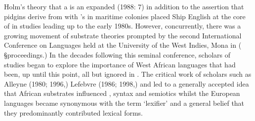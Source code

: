 Holm’s theory that a  is an expanded  (1988: 7) in addition to the assertion that pidgins derive from  with ’s  in maritime colonies placed Ship English at the core of  in studies leading up to the early 1980s. However, concurrently, there was a growing movement of substrate theories prompted by the second International Conference on  Languages held at the University of the West Indies, Mona in \citealt{April1968} (\citealt{Hymes1971} §proceedings.) In the decades following this seminal conference, scholars of  studies began to explore the importance of West African languages that had been, up until this point, all but ignored in . The critical work of scholars such as Alleyne (1980; 1996,) Lefebvre (1986; 1998,) and \citet{Parkvall2000} led to a generally accepted idea that African substrates influenced  , syntax and semiotics whilst the  European languages became synonymous with the term ‘lexifier’ and a general belief that they predominantly contributed lexical forms.

